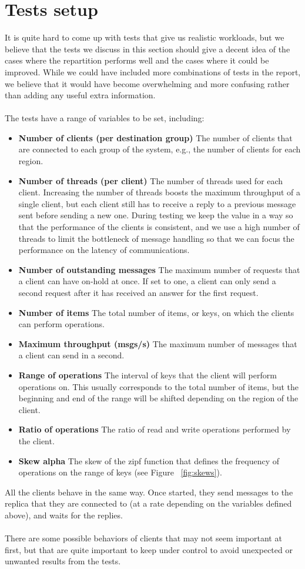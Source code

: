 \section{Tests setup}\label{sec:tests-setup}
It is quite hard to come up with tests that give us realistic workloads, but we believe that the tests we discuss in this section should give a decent idea of the cases where the repartition performs well and the cases where it could be improved. While we could have included more combinations of tests in the report, we believe that it would have become overwhelming and more confusing rather than adding any useful extra information.
\\\\
The tests have a range of variables to be set, including:
\begin{itemize}
  \item \textbf{Number of clients (per destination group)} The number of clients that are connected to each group of the system, e.g., the number of clients for each region.
  \item \textbf{Number of threads (per client)} The number of threads used for each client. Increasing the number of threads boosts the maximum throughput of a single client, but each client still has to receive a reply to a previous message sent before sending a new one. During testing we keep the value in a way so that the performance of the clients is consistent, and we use a high number of threads to limit the bottleneck of message handling so that we can focus the performance on the latency of communications.
  \item \textbf{Number of outstanding messages} The maximum number of requests that a client can have on-hold at once. If set to one, a client can only send a second request after it has received an answer for the first request.
  \item \textbf{Number of items} The total number of items, or keys, on which the clients can perform operations.
  \item \textbf{Maximum throughput (msgs/s)} The maximum number of messages that a client can send in a second.
  \item \textbf{Range of operations} The interval of keys that the client will perform operations on. This usually corresponds to the total number of items, but the beginning and end of the range will be shifted depending on the region of the client.
  \item \textbf{Ratio of operations} The ratio of read and write operations performed by the client.
  \item \textbf{Skew alpha} The skew of the zipf function that defines the frequency of operations on the range of keys (see Figure ~\ref{fig:skews}).
\end{itemize}
All the clients behave in the same way. Once started, they send messages to the replica that they are connected to (at a rate depending on the variables defined above), and waits for the replies.
\\\\
There are some possible behaviors of clients that may not seem important at first, but that are quite important to keep under control to avoid unexpected or unwanted results from the tests.

